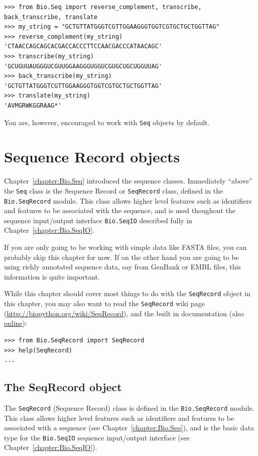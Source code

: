 \documentclass{report}
\begin{document}
\begin{verbatim}
>>> from Bio.Seq import reverse_complement, transcribe, back_transcribe, translate
>>> my_string = "GCTGTTATGGGTCGTTGGAAGGGTGGTCGTGCTGCTGGTTAG"
>>> reverse_complement(my_string)
'CTAACCAGCAGCACGACCACCCTTCCAACGACCCATAACAGC'
>>> transcribe(my_string)
'GCUGUUAUGGGUCGUUGGAAGGGUGGUCGUGCUGCUGGUUAG'
>>> back_transcribe(my_string)
'GCTGTTATGGGTCGTTGGAAGGGTGGTCGTGCTGCTGGTTAG'
>>> translate(my_string)
'AVMGRWKGGRAAG*'
\end{verbatim}

\noindent You are, however, encouraged to work with \verb|Seq| objects by default.

\chapter{Sequence Record objects}
\label{chapter:SeqRecord}

Chapter~\ref{chapter:Bio.Seq} introduced the sequence classes.  Immediately ``above'' the \verb|Seq| class is the Sequence Record or \verb|SeqRecord| class, defined in the \verb|Bio.SeqRecord| module. This class allows higher level features such as identifiers and features to be associated with the sequence, and is used thoughout the sequence input/output interface \verb|Bio.SeqIO| described fully in Chapter~\ref{chapter:Bio.SeqIO}.

If you are only going to be working with simple data like FASTA files, you can probably skip this chapter
for now. If on the other hand you are going to be using richly annotated sequence data, say from GenBank
or EMBL files, this information is quite important.

While this chapter should cover most things to do with the \verb|SeqRecord| object in this chapter, you may also want to read the \verb|SeqRecord| wiki page (\url{http://biopython.org/wiki/SeqRecord}), and the built in documentation (also \href{http://biopython.org/DIST/docs/api/Bio.SeqRecord.SeqRecord-class.html}{online}):

\begin{verbatim}
>>> from Bio.SeqRecord import SeqRecord
>>> help(SeqRecord)
...
\end{verbatim}

\section{The SeqRecord object}
\label{sec:SeqRecord}

The \verb|SeqRecord| (Sequence Record) class is defined in the \verb|Bio.SeqRecord| module. This class allows higher level features such as identifiers and features to be associated with a sequence (see Chapter~\ref{chapter:Bio.Seq}), and is the basic data type for the \verb|Bio.SeqIO| sequence input/output interface (see Chapter~\ref{chapter:Bio.SeqIO}).
\end{document}
